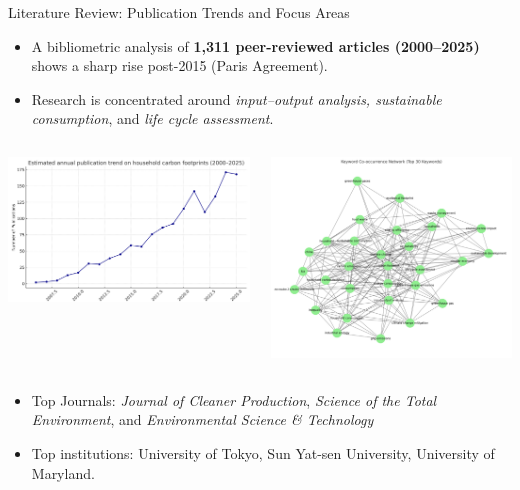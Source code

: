 \documentclass{beamer}
\begin{document}
\begin{frame}{Literature Review: Publication Trends and Focus Areas}
\small
\vspace{-2.5em}
\begin{itemize}
  \footnotesize
  \item A bibliometric analysis of \textbf{1,311 peer-reviewed articles (2000–2025)} shows a sharp rise post-2015 (Paris Agreement).
  \item Research is concentrated around \textit{input–output analysis, sustainable consumption}, and \textit{life cycle assessment}.
  \end{itemize}
\vspace{-1.0em}
\begin{columns}
  \centering
  \begin{column}{0.5\textwidth}
    \centering
    \includegraphics[width=0.8\linewidth]{publication_trend_darkblue_estimated2025.png}
  \end{column}
  \begin{column}{0.6\textwidth}
    \centering
    \includegraphics[width=0.7\linewidth]{keyword_cooccurrence.png}
  \end{column}
\end{columns}

\vspace{-0.5em}
\begin{itemize}
  \footnotesize
\item Top Journals: \textit{Journal of Cleaner Production}, \textit{Science of the Total Environment}, and \textit{Environmental Science \& Technology}
  \item Top institutions: University of Tokyo, Sun Yat-sen University, University of Maryland.
\end{itemize}

\end{frame}
\end{document}
